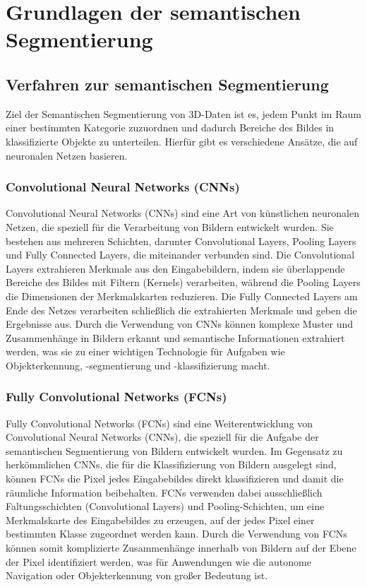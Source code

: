 \chapter{Grundlagen der semantischen Segmentierung}

\section{Verfahren zur semantischen Segmentierung}

Ziel der Semantischen Segmentierung von 3D-Daten ist es, jedem Punkt im Raum
einer bestimmten Kategorie zuzuordnen und dadurch Bereiche des Bildes in
klassifizierte Objekte zu unterteilen. Hierfür gibt es verschiedene Ansätze,
die auf neuronalen Netzen basieren.

\subsection{Convolutional Neural Networks (CNNs)}
Convolutional Neural Networks (CNNs) sind eine Art von künstlichen neuronalen
Netzen, die speziell für die Verarbeitung von Bildern entwickelt wurden. Sie
bestehen aus mehreren Schichten, darunter Convolutional Layers, Pooling Layers
und Fully Connected Layers, die miteinander verbunden sind. Die Convolutional
Layers extrahieren Merkmale aus den Eingabebildern, indem sie überlappende
Bereiche des Bildes mit Filtern (Kernels) verarbeiten, während die Pooling
Layers die Dimensionen der Merkmalskarten reduzieren. Die Fully Connected
Layers am Ende des Netzes verarbeiten schließlich die extrahierten Merkmale und
geben die Ergebnisse aus. Durch die Verwendung von CNNs können komplexe Muster
und Zusammenhänge in Bildern erkannt und semantische Informationen extrahiert
werden, was sie zu einer wichtigen Technologie für Aufgaben wie
Objekterkennung, -segmentierung und -klassifizierung macht.
\subsection{Fully Convolutional Networks (FCNs)}
Fully Convolutional Networks (FCNs) sind eine Weiterentwicklung von
Convolutional Neural Networks (CNNs), die speziell für die Aufgabe der
semantischen Segmentierung von Bildern entwickelt wurden. Im Gegensatz zu
herkömmlichen CNNs, die für die Klassifizierung von Bildern ausgelegt sind,
können FCNs die Pixel jedes Eingabebildes direkt klassifizieren und damit die
räumliche Information beibehalten. FCNs verwenden dabei ausschließlich
Faltungsschichten (Convolutional Layers) und Pooling-Schichten, um eine
Merkmalskarte des Eingabebildes zu erzeugen, auf der jedes Pixel einer
bestimmten Klasse zugeordnet werden kann. Durch die Verwendung von FCNs können
somit komplizierte Zusammenhänge innerhalb von Bildern auf der Ebene der Pixel
identifiziert werden, was für Anwendungen wie die autonome Navigation oder
Objekterkennung von großer Bedeutung ist.
